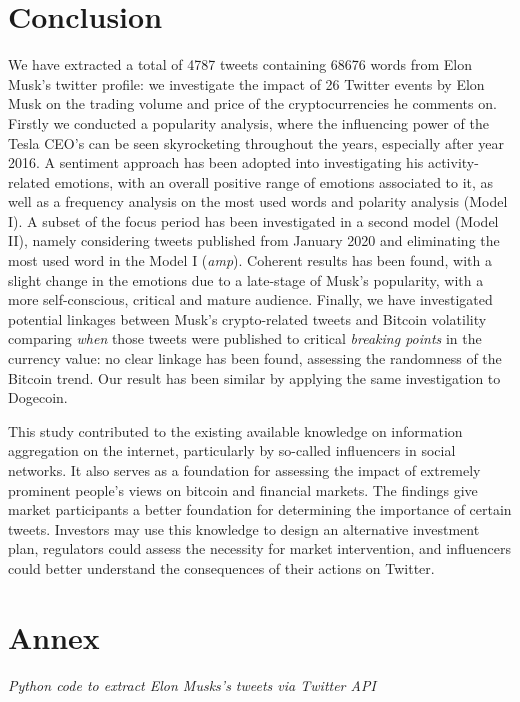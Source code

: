 \documentclass[
]{article}
\begin{document}
\hypertarget{conclusion}{%
\section{Conclusion}\label{conclusion}}

We have extracted a total of 4787 tweets containing 68676 words from
Elon Musk's twitter profile: we investigate the impact of 26 Twitter
events by Elon Musk on the trading volume and price of the
cryptocurrencies he comments on. Firstly we conducted a popularity
analysis, where the influencing power of the Tesla CEO's can be seen
skyrocketing throughout the years, especially after year 2016. A
sentiment approach has been adopted into investigating his
activity-related emotions, with an overall positive range of emotions
associated to it, as well as a frequency analysis on the most used words
and polarity analysis (Model I). A subset of the focus period has been
investigated in a second model (Model II), namely considering tweets
published from January 2020 and eliminating the most used word in the
Model I (\emph{amp}). Coherent results has been found, with a slight
change in the emotions due to a late-stage of Musk's popularity, with a
more self-conscious, critical and mature audience. Finally, we have
investigated potential linkages between Musk's crypto-related tweets and
Bitcoin volatility comparing \emph{when} those tweets were published to
critical \emph{breaking points} in the currency value: no clear linkage
has been found, assessing the randomness of the Bitcoin trend. Our
result has been similar by applying the same investigation to Dogecoin.

This study contributed to the existing available knowledge on
information aggregation on the internet, particularly by so-called
influencers in social networks. It also serves as a foundation for
assessing the impact of extremely prominent people's views on bitcoin
and financial markets. The findings give market participants a better
foundation for determining the importance of certain tweets. Investors
may use this knowledge to design an alternative investment plan,
regulators could assess the necessity for market intervention, and
influencers could better understand the consequences of their actions on
Twitter.

\hypertarget{annex}{%
\section{Annex}\label{annex}}

\emph{Python code to extract Elon Musks's tweets via Twitter API}
\end{document}

